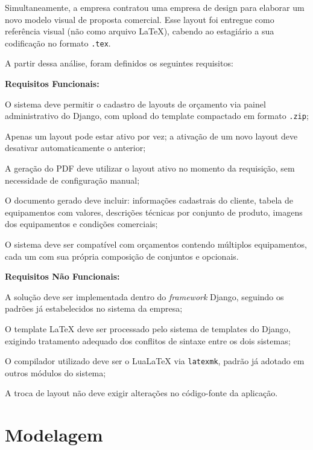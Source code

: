 Simultaneamente, a empresa contratou uma empresa de design para elaborar um novo modelo visual de
proposta comercial. Esse layout foi entregue como referência visual (não como arquivo LaTeX), cabendo ao
estagiário a sua codificação no formato \texttt{.tex}.

A partir dessa análise, foram definidos os seguintes requisitos:

\textbf{Requisitos Funcionais:}
\begin{alineas}
    \item O sistema deve permitir o cadastro de layouts de orçamento via painel administrativo do Django,
    com upload do template compactado em formato \texttt{.zip};
    \item Apenas um layout pode estar ativo por vez; a ativação de um novo layout deve desativar
    automaticamente o anterior;
    \item A geração do PDF deve utilizar o layout ativo no momento da requisição, sem necessidade de
    configuração manual;
    \item O documento gerado deve incluir: informações cadastrais do cliente, tabela de equipamentos com
    valores, descrições técnicas por conjunto de produto, imagens dos equipamentos e condições comerciais;
    \item O sistema deve ser compatível com orçamentos contendo múltiplos equipamentos, cada um com sua
    própria composição de conjuntos e opcionais.
\end{alineas}

\textbf{Requisitos Não Funcionais:}
\begin{alineas}
    \item A solução deve ser implementada dentro do \textit{framework} Django, seguindo os padrões já
    estabelecidos no sistema da empresa;
    \item O template LaTeX deve ser processado pelo sistema de templates do Django, exigindo tratamento
    adequado dos conflitos de sintaxe entre os dois sistemas;
    \item O compilador utilizado deve ser o LuaLaTeX via \texttt{latexmk}, padrão já adotado em outros
    módulos do sistema;
    \item A troca de layout não deve exigir alterações no código-fonte da aplicação.
\end{alineas}

\section{Modelagem}
\label{sec:modelagem}

